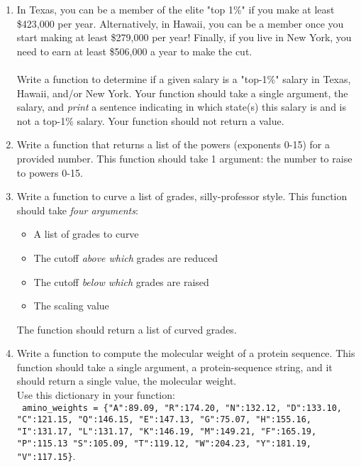 \documentclass{article}[12pt]
\newcommand{\code}[1]{\texttt{#1}}  %
\begin{document}
\begin{enumerate}[itemsep=5ex]

	\item In Texas, you can be a member of the elite "top 1\%" if you make at least \$423,000 per year. Alternatively, in Hawaii, you can be a member once you start making at least \$279,000 per year! Finally, if you live in New York, you need to earn at least \$506,000 a year to make the cut. \\\\ Write a function to determine if a given salary is a "top-1\%" salary in Texas, Hawaii, and/or New York. Your function should take a single argument, the salary, and \emph{print} a sentence indicating in which state(s) this salary is and is not a top-1\% salary. Your function should not return a value.
	
	
	\item Write a function that returns a list of the powers (exponents 0-15) for a provided number. This function should take 1 argument: the number to raise to powers 0-15.
	
	\item Write a function to curve a list of grades, silly-professor style. This function should take \emph{four arguments}:
	\begin{itemize}
		\item A list of grades to curve
		\item The cutoff \emph{above which} grades are reduced
		\item The cutoff \emph{below which} grades are raised
		\item The scaling value
	\end{itemize}
	The function should return a list of curved grades.
	
	\item Write a function to compute the molecular weight of a protein sequence. This function should take a single argument, a protein-sequence string, and it should return a single value, the molecular weight. \\ Use this dictionary in your function:
	\\ \code{ amino\_weights = \{"A":89.09, "R":174.20, "N":132.12, "D":133.10, "C":121.15, "Q":146.15, "E":147.13, "G":75.07, "H":155.16, "I":131.17, "L":131.17, "K":146.19, "M":149.21, "F":165.19, "P":115.13 "S":105.09, "T":119.12, "W":204.23, "Y":181.19, "V":117.15\}}. 
	

\end{enumerate}
\end{document}
